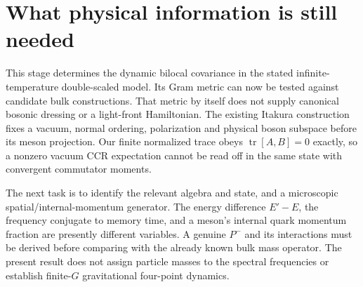 \documentclass[11pt]{article}
\newcommand{\tr}{\operatorname{tr}}
\begin{document}
\section{What physical information is still needed}
This stage determines the dynamic bilocal covariance in the stated
infinite-temperature double-scaled model. Its Gram metric can now be
tested against candidate bulk constructions. That metric by itself
does not supply canonical bosonic dressing or a light-front Hamiltonian.
The existing Itakura construction \cite{Itakura} fixes a vacuum,
normal ordering, polarization and physical boson subspace before its
meson projection. Our finite normalized trace obeys
$\tr[A,B]=0$ exactly, so a nonzero vacuum CCR expectation cannot be
read off in the same state with convergent commutator moments.

The next task is to identify the relevant algebra and state, and a
microscopic spatial/internal-momentum generator. The energy difference
$E'-E$, the frequency conjugate to memory time, and a meson's internal
quark momentum fraction are presently different variables. A genuine
$P^-$ and its interactions must be derived before comparing with the
already known bulk mass operator. The present result does not assign
particle masses to the spectral frequencies or establish finite-$G$
gravitational four-point dynamics.

\newpage
\end{document}
